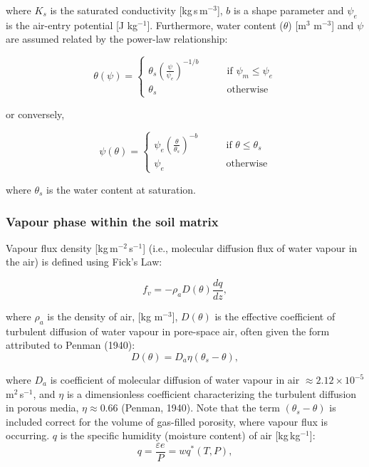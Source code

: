 \documentclass[10pt, letterpapr]{article}
\begin{document}
\noindent where $K_s$ is the saturated conductivity [kg\,s\,m$^{-3}$], $b$ is a shape parameter and $\psi_e$ is the air-entry potential [J kg$^{-1}$]. Furthermore, water content ($\theta$) [m$^3$ m$^{-3}$] and $\psi$ are assumed related by the power-law relationship:

\[
	\theta(\psi)=
	\begin{cases}
		\theta_s\left(\frac{\psi}{\psi_e}\right)^{-1/b}  \qquad &\text{if $\psi_m\leq\psi_e$} \\
		\theta_s  &\text{otherwise}
	\end{cases}
\]

\noindent or conversely,

\[
	\psi(\theta)=
	\begin{cases}
		\psi_e\left(\frac{\theta}{\theta_s}\right)^{-b}  \qquad &\text{if $\theta\leq\theta_s$} \\
		\psi_e  &\text{otherwise}
	\end{cases}
\]

\noindent where $\theta_s$ is the water content at saturation.



\subsubsection*{Vapour phase within the soil matrix}

Vapour flux density [kg\,m$^{-2}$\,s$^{-1}$] (i.e., molecular diffusion flux of water vapour in the air) is defined using Fick's Law: %

\[
	f_v=-\rho_a D(\theta) \frac{dq}{dz},
\]

\noindent where $\rho_a$ is the density of air, [kg m$^{-3}$], $D(\theta)$ is the effective coefficient of turbulent diffusion of water vapour in pore-space air, often given the form attributed to Penman (1940):
\[
	D(\theta)=D_a\eta\left(\theta_s-\theta\right),
\]

\noindent where $D_a$ is coefficient of molecular diffusion of water vapour in air $\approx2.12\times10^{-5}$ m$^2$\,s$^{-1}$, and $\eta$ is a dimensionless coefficient characterizing the turbulent diffusion in porous media, $\eta\approx0.66$ (Penman, 1940). Note that the term $\left(\theta_s-\theta\right)$ is included correct for the volume of gas-filled porosity, where vapour flux is occurring. $q$ is the specific humidity (moisture content) of air [kg\,kg$^{-1}$]:
\[
	q=\frac{\varepsilon e}{P}=wq^*(T,P),
\]
\end{document}
